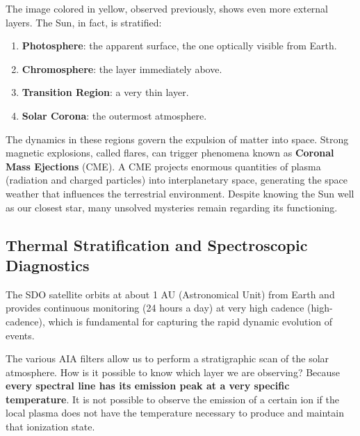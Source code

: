 The image colored in yellow, observed previously, shows even more external layers. The Sun, in fact, is stratified:

\begin{enumerate}
    \item \textbf{Photosphere}: the apparent surface, the one optically visible from Earth.
    \item \textbf{Chromosphere}: the layer immediately above.
    \item \textbf{Transition Region}: a very thin layer.
    \item \textbf{Solar Corona}: the outermost atmosphere.
\end{enumerate}

The dynamics in these regions govern the expulsion of matter into space. Strong magnetic explosions, called flares, can trigger phenomena known as \textbf{Coronal Mass Ejections} (CME). A CME projects enormous quantities of plasma (radiation and charged particles) into interplanetary space, generating the space weather that influences the terrestrial environment. Despite knowing the Sun well as our closest star, many unsolved mysteries remain regarding its functioning.

    \subsection{Thermal Stratification and Spectroscopic Diagnostics}
    
    The SDO satellite orbits at about 1 AU (Astronomical Unit) from Earth and provides continuous monitoring (24 hours a day) at very high cadence (high-cadence), which is fundamental for capturing the rapid dynamic evolution of events.
    
    The various AIA filters allow us to perform a stratigraphic scan of the solar atmosphere. How is it possible to know which layer we are observing?
    Because \textbf{every spectral line has its emission peak at a very specific temperature}. It is not possible to observe the emission of a certain ion if the local plasma does not have the temperature necessary to produce and maintain that ionization state.
    
